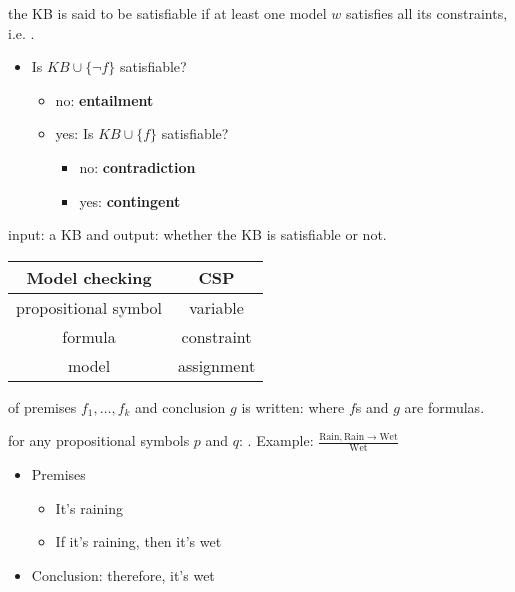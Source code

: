  the KB is said to be satisfiable if at least one model
$w$ satisfies all its constraints, i.e.
.
\begin{itemize}
    \item Is $KB \cup \{\neg f\}$ satisfiable? \begin{itemize}
        \item no: \textbf{entailment}
        \item yes: Is $KB \cup \{f\}$ satisfiable? \begin{itemize}
            \item no: \textbf{contradiction}
            \item yes: \textbf{contingent}
        \end{itemize}
    \end{itemize}
\end{itemize}

 input: a KB and output: whether the KB is satisfiable or
not.

\begin{tabular}{|c|c|}
    \hline
    \textbf{Model checking} & \textbf{CSP} \\
    \hline
    propositional symbol & variable \\ 
    \hline
    formula & constraint \\
    \hline
    model & assignment\\
    \hline
\end{tabular}

 of premises $f_1, \dots, f_k$ and conclusion $g$ is written:
 where $f$s and $g$ are formulas.

 for any propositional symbols $p$ and $q$:
.
Example: $\frac{\text{Rain}, \text{Rain} \rightarrow \text{Wet}}{\text{Wet}}$
\begin{itemize}
    \item Premises\begin{itemize}
        \item It's raining
        \item If it's raining, then it's wet
    \end{itemize}
    \item Conclusion: therefore, it's wet
\end{itemize}


